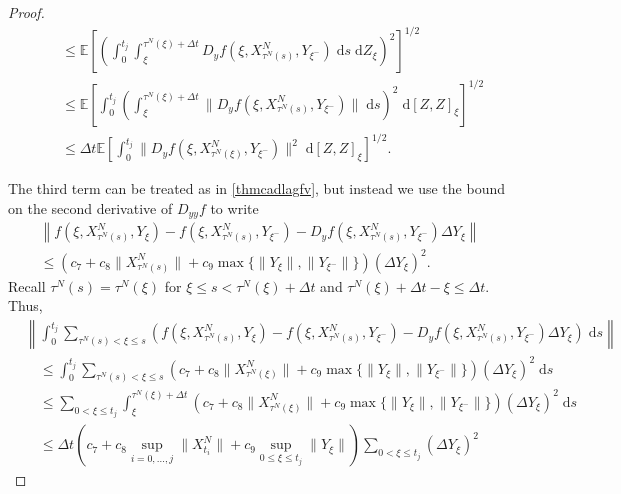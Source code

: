 \documentclass[reqno,12pt]{amsart}
\theoremstyle{plain} %
\theoremstyle{definition} %
\begin{document}
\begin{proof}
\begin{align*}
        & \quad \leq \mathbb{E}\left[\left(\int_0^{t_j} \int_{\xi}^{\tau^N(\xi) + \Delta t} D_y f(\xi, X_{\tau^N(s)}^N, Y_{\xi^-}) \;\mathrm{d}s \;\mathrm{d}Z_\xi\right)^2\right]^{1/2} \\
        & \quad \leq \mathbb{E}\left[\int_0^{t_j} \left(\int_{\xi}^{\tau^N(\xi) + \Delta t} \|D_y f(\xi, X_{\tau^N(s)}^N, Y_{\xi^-})\| \;\mathrm{d}s\right)^2 \;\mathrm{d}[Z, Z]_\xi\right]^{1/2} \\
        & \quad \leq \Delta t\mathbb{E}\left[\int_0^{t_j} \|D_y f(\xi, X_{\tau^N(\xi)}^N, Y_{\xi^-})\|^2 \;\mathrm{d}[Z, Z]_\xi\right]^{1/2}.
    \end{align*}

    The third term can be treated as in \cref{thmcadlagfv}, but instead we use the bound on the second derivative of $D_{yy}f$ to write
    \begin{multline*}
        \left\| f(\xi, X_{\tau^N(s)}^N, Y_\xi) - f(\xi, X_{\tau^N(s)}^N, Y_{\xi^{-}}) - D_y f(\xi, X_{\tau^N(s)}^N, Y_{\xi^-}) \Delta Y_\xi \right\| \\
        \leq \left(c_7 + c_8 \|X_{\tau^N(s)}^N\| + c_9 \max\{\|Y_\xi\|, \|Y_{\xi^-}\|\} \right)\left( \Delta Y_\xi \right)^2.
    \end{multline*}
    Recall $\tau^N(s) = \tau^N(\xi)$ for $\xi \leq s < \tau^N(\xi) + \Delta t$ and $\tau^N(\xi) + \Delta t - \xi \leq \Delta t$. Thus,
    \begin{align*}
        & \left\|\int_0^{t_j} \sum_{\tau^N(s) < \xi \leq s} \left(f(\xi, X_{\tau^N(s)}^N, Y_\xi) - f(\xi, X_{\tau^N(s)}^N, Y_{\xi^{-}}) - D_y f(\xi, X_{\tau^N(s)}^N, Y_{\xi^-})\Delta Y_\xi\right) \;\mathrm{d}s\right\| \\
        & \quad \leq \int_0^{t_j} \sum_{\tau^N(s) < \xi \leq s} \left(c_7 + c_8 \|X_{\tau^N(\xi)}^N\| + c_9 \max\{\|Y_\xi\|, \|Y_{\xi^-}\|\} \right)\left( \Delta Y_\xi \right)^2\;\mathrm{d}s \\
        & \quad \leq \sum_{0 < \xi \leq t_j}\int_\xi^{\tau^N(\xi) + \Delta t} \left(c_7 + c_8 \|X_{\tau^N(\xi)}^N\| + c_9 \max\{\|Y_\xi\|, \|Y_{\xi^-}\|\} \right)\left( \Delta Y_\xi \right)^2\;\mathrm{d}s \\
        & \quad \leq \Delta t \left( c_7 + c_8 \sup_{i=0, \ldots, j}\|X_{t_i}^N\| + c_9 \sup_{0\leq \xi \leq t_j}\|Y_\xi\|\right) \sum_{0 < \xi \leq t_j}\left( \Delta Y_\xi \right)^2
    \end{align*}


\end{proof}
\end{document}
